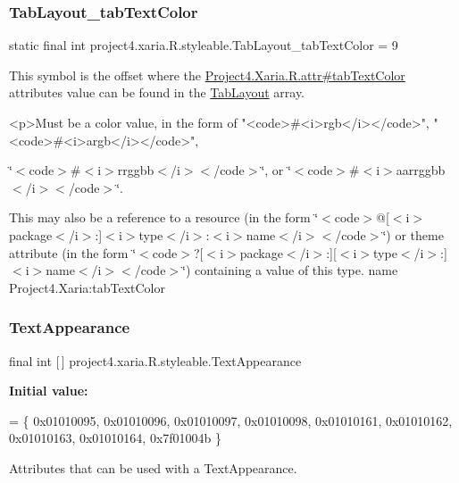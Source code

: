 \subsubsection{\texorpdfstring{Tab\+Layout\+\_\+tab\+Text\+Color}{TabLayout\_tabTextColor}}
{\footnotesize\ttfamily static final int project4.\+xaria.\+R.\+styleable.\+Tab\+Layout\+\_\+tab\+Text\+Color = 9\hspace{0.3cm}{\ttfamily [static]}}

This symbol is the offset where the \hyperlink{}{Project4.\+Xaria.\+R.\+attr\#tab\+Text\+Color} attribute\textquotesingle{}s value can be found in the \hyperlink{classproject4_1_1xaria_1_1R_1_1styleable_ab6bfb1f97ae9fba16f4f90d50871d4a8}{Tab\+Layout} array.

\begin{DoxyVerb}      <p>Must be a color value, in the form of "<code>#<i>rgb</i></code>", "<code>#<i>argb</i></code>",
\end{DoxyVerb}
 \char`\"{}$<$code$>$\#$<$i$>$rrggbb$<$/i$>$$<$/code$>$\char`\"{}, or \char`\"{}$<$code$>$\#$<$i$>$aarrggbb$<$/i$>$$<$/code$>$\char`\"{}. 

This may also be a reference to a resource (in the form \char`\"{}$<$code$>$@\mbox{[}$<$i$>$package$<$/i$>$\+:\mbox{]}$<$i$>$type$<$/i$>$\+:$<$i$>$name$<$/i$>$$<$/code$>$\char`\"{}) or theme attribute (in the form \char`\"{}$<$code$>$?\mbox{[}$<$i$>$package$<$/i$>$\+:\mbox{]}\mbox{[}$<$i$>$type$<$/i$>$\+:\mbox{]}$<$i$>$name$<$/i$>$$<$/code$>$\char`\"{}) containing a value of this type.  name Project4.\+Xaria\+:tab\+Text\+Color \mbox{\label{classproject4_1_1xaria_1_1R_1_1styleable_a324a4bda63d9f00d154e0a6c1eb718b0}} 
\subsubsection{\texorpdfstring{Text\+Appearance}{TextAppearance}}
{\footnotesize\ttfamily final int \mbox{[}$\,$\mbox{]} project4.\+xaria.\+R.\+styleable.\+Text\+Appearance\hspace{0.3cm}{\ttfamily [static]}}

{\bfseries Initial value\+:}
\begin{DoxyCode}
= \{
            0x01010095, 0x01010096, 0x01010097, 0x01010098,
            0x01010161, 0x01010162, 0x01010163, 0x01010164,
            0x7f01004b
        \}
\end{DoxyCode}
Attributes that can be used with a Text\+Appearance. 

